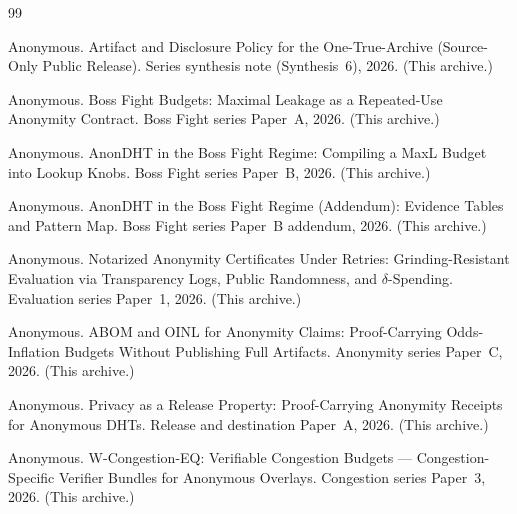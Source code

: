 \documentclass[11pt]{article}
\begin{document}
\begin{thebibliography}{99}\small

Anonymous.
\newblock Artifact and Disclosure Policy for the One-True-Archive (Source-Only Public Release).
\newblock Series synthesis note (Synthesis~6), 2026. (This archive.)

Anonymous.
\newblock Boss Fight Budgets: Maximal Leakage as a Repeated-Use Anonymity Contract.
\newblock Boss Fight series Paper~A, 2026. (This archive.)

Anonymous.
\newblock AnonDHT in the Boss Fight Regime: Compiling a MaxL Budget into Lookup Knobs.
\newblock Boss Fight series Paper~B, 2026. (This archive.)

Anonymous.
\newblock AnonDHT in the Boss Fight Regime (Addendum): Evidence Tables and Pattern Map.
\newblock Boss Fight series Paper~B addendum, 2026. (This archive.)

Anonymous.
\newblock Notarized Anonymity Certificates Under Retries: Grinding-Resistant Evaluation via Transparency Logs, Public Randomness, and $\delta$-Spending.
\newblock Evaluation series Paper~1, 2026. (This archive.)

Anonymous.
\newblock ABOM and OINL for Anonymity Claims: Proof-Carrying Odds-Inflation Budgets Without Publishing Full Artifacts.
\newblock Anonymity series Paper~C, 2026. (This archive.)

Anonymous.
\newblock Privacy as a Release Property: Proof-Carrying Anonymity Receipts for Anonymous DHTs.
\newblock Release and destination Paper~A, 2026. (This archive.)

Anonymous.
\newblock W-Congestion-EQ: Verifiable Congestion Budgets --- Congestion-Specific Verifier Bundles for Anonymous Overlays.
\newblock Congestion series Paper~3, 2026. (This archive.)

\end{thebibliography}
\end{document}

